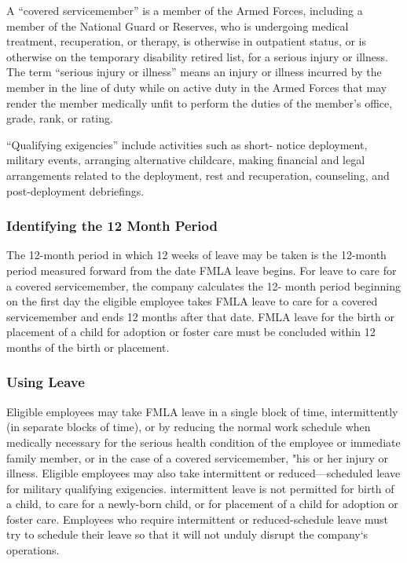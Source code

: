 A “covered servicemember” is a member of the Armed Forces, including a member of the National Guard or Reserves, who is undergoing medical treatment, recuperation, or therapy, is otherwise in outpatient status, or is otherwise on the temporary disability retired list, for a serious injury or illness. The term “serious injury or illness” means an injury or illness incurred by the member in the line of duty while on active duty in the Armed Forces that may render the member medically unfit to perform the duties of the member's office, grade, rank, or rating.

“Qualifying exigencies” include activities such as short- notice deployment, military events, arranging alternative childcare, making financial and legal arrangements related to the deployment, rest and recuperation, counseling, and post-deployment debriefings.

\subsubsection{Identifying the 12 Month Period}

The 12-month period in which 12 weeks of leave may be taken is the 12-month period measured forward from the date FMLA leave begins. For leave to care for a covered servicemember, the company calculates the 12- month period beginning on the first day the eligible employee takes FMLA leave to care for a covered servicemember and ends 12 months after that date. FMLA leave for the birth or placement of a child for adoption or foster care must be concluded within 12 months of the birth or placement.

\subsubsection{Using Leave}

Eligible employees may take FMLA leave in a single block of time, intermittently (in separate blocks of time), or by reducing the normal work schedule when medically necessary for the serious health condition of the employee or immediate family member, or in the case of a covered servicemember, "his or her injury or illness. Eligible employees may also take intermittent or reduced—scheduled leave for military qualifying exigencies. intermittent leave is not permitted for birth of a child, to care for a newly-born child, or for placement of a child for adoption or foster care. Employees who require intermittent or reduced-schedule leave must try to schedule their leave so that it will not unduly disrupt the company‘s operations.


